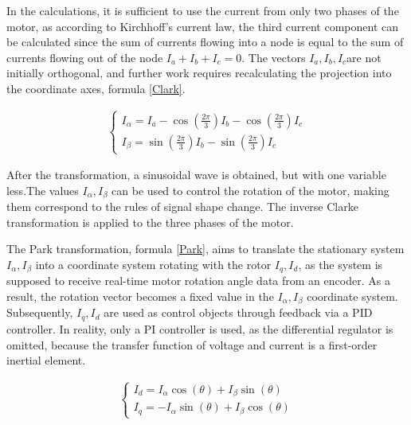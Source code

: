 In the calculations, it is sufficient to use the current from only two phases of the motor, as according to Kirchhoff's current law, the third current component can be calculated since the sum of currents flowing into a node is equal to the sum of currents flowing out of the node $I_a+I_b+I_c=0$. The vectors $I_a,I_b,I_c$are not initially orthogonal, and further work requires recalculating the projection into the coordinate axes, formula \ref{Clark}.
\begin{ceqn}
	\begin{align} \label{Clark}
		\begin{cases}
			I_{\alpha} = I_a - \cos\left(\frac{2\pi}{3}\right) I_b - \cos\left(\frac{2\pi}{3}\right) I_c \\
			I_{\beta} = \sin\left(\frac{2\pi}{3}\right) I_b - \sin\left(\frac{2\pi}{3}\right) I_c
		\end{cases}
	\end{align}
\end{ceqn}

After the transformation, a sinusoidal wave is obtained, but with one variable less.The values $I_\alpha, I_\beta$ can be used to control the rotation of the motor, making them correspond to the rules of signal shape change. The inverse Clarke transformation is applied to the three phases of the motor.

The Park transformation, formula \ref{Park}, aims to translate the stationary system $I_\alpha, I_\beta$ into a coordinate system rotating with the rotor $I_q, I_d$, as the system is supposed to receive real-time motor rotation angle data from an encoder. As a result, the rotation vector becomes a fixed value in the $I_\alpha, I_\beta$ coordinate system. Subsequently, $I_q, I_d$ are used as control objects through feedback via a PID controller. In reality, only a PI controller is used, as the differential regulator is omitted, because the transfer function of voltage and current is a first-order inertial element.


\begin{ceqn}
	\begin{align} \label{Park}
		\begin{cases}
			I_d = I_\alpha \cos(\theta) + I_\beta \sin(\theta) \\
			I_q = -I_\alpha \sin(\theta) + I_\beta \cos(\theta)
		\end{cases}
	\end{align}
\end{ceqn}




